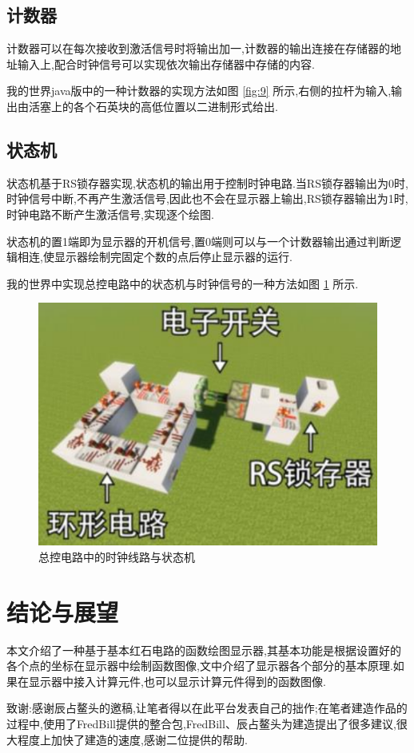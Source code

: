 \documentclass[UTF8,12pt,punct=kaiming,fontset=none]{ctexart}
\begin{document}
\subsection{计数器}
计数器可以在每次接收到激活信号时将输出加一,计数器的输出连接在存储器的地址输入上,配合时钟信号可以实现依次输出存储器中存储的内容.

我的世界java版中的一种计数器的实现方法如图 \ref{fig:9} 所示,右侧的拉杆为输入,输出由活塞上的各个石英块的高低位置以二进制形式给出.

\subsection{状态机}
状态机基于RS锁存器实现,状态机的输出用于控制时钟电路.当RS锁存器输出为0时,时钟信号中断,不再产生激活信号,因此也不会在显示器上输出,RS锁存器输出为1时,时钟电路不断产生激活信号,实现逐个绘图.

状态机的置1端即为显示器的开机信号,置0端则可以与一个计数器输出通过判断逻辑相连,使显示器绘制完固定个数的点后停止显示器的运行.

我的世界中实现总控电路中的状态机与时钟信号的一种方法如图 \ref{fig:10} 所示.

\begin{figure}[H]
    \centering
    \includegraphics[width=0.25\linewidth]{figures/10.png}
    \caption{总控电路中的时钟线路与状态机}
    \label{fig:10}
\end{figure}

\section{结论与展望}
本文介绍了一种基于基本红石电路的函数绘图显示器,其基本功能是根据设置好的各个点的坐标在显示器中绘制函数图像,文中介绍了显示器各个部分的基本原理.如果在显示器中接入计算元件,也可以显示计算元件得到的函数图像.

致谢:感谢辰占鳌头的邀稿,让笔者得以在此平台发表自己的拙作;在笔者建造作品的过程中,使用了FredBill提供的整合包,FredBill、辰占鳌头为建造提出了很多建议,很大程度上加快了建造的速度,感谢二位提供的帮助.



\end{document}
